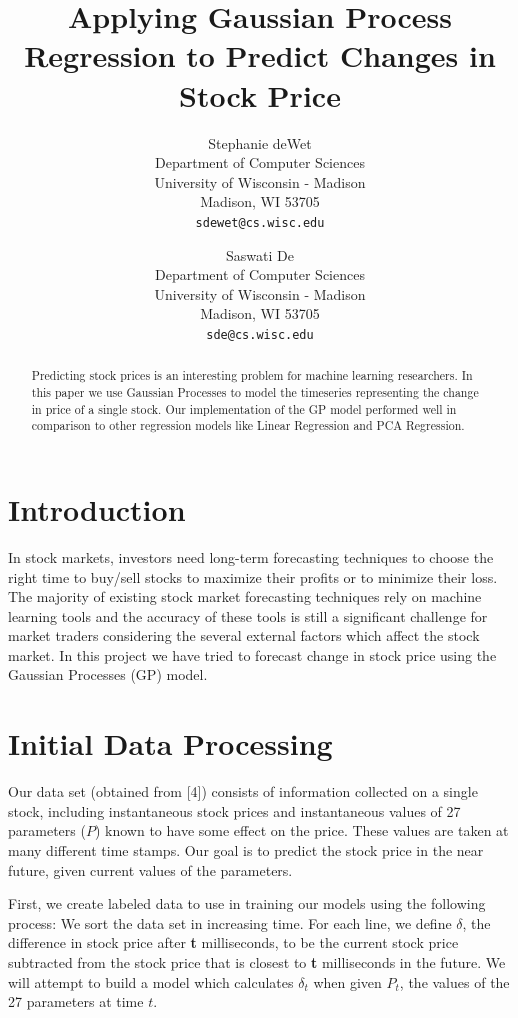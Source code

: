 \documentclass{article} %
\author{
Stephanie deWet \\
Department of Computer Sciences\\
University of Wisconsin - Madison \\
Madison, WI 53705 \\
\texttt{sdewet@cs.wisc.edu} \\
\and
Saswati De \\
Department of Computer Sciences\\
University of Wisconsin - Madison \\
Madison, WI 53705 \\
\texttt{sde@cs.wisc.edu} \\
}
\title{Applying Gaussian Process Regression to Predict Changes in Stock Price}
\begin{document}
\maketitle

\begin{abstract}
Predicting stock prices is an interesting problem for machine learning researchers. In this paper we use Gaussian Processes to model the timeseries representing the change in price of a single stock. Our implementation of the GP model performed well in comparison to other regression models like Linear Regression and PCA Regression.
\end{abstract}

\section{Introduction}
In stock markets, investors need long-term forecasting techniques to choose the right time to buy/sell stocks to maximize their profits or to minimize their loss. The majority of existing stock market forecasting techniques rely on machine learning tools and the accuracy of these tools is still a significant challenge for market traders considering the several external factors which affect the stock market. In this project we have tried to forecast change in stock price using the Gaussian Processes (GP) model.

\section{Initial Data Processing}
Our data set (obtained from [4]) consists of information collected on a single stock, including instantaneous stock prices and instantaneous values of 27 parameters ($P$) known to have some effect on the price.
These values are taken at many different time stamps.
Our goal is to predict the stock price in the near future, given current values of the parameters.

First, we create labeled data to use in training our models using the following process:
We sort the data set in increasing time.
For each line, we define $\delta$, the difference in stock price after \textbf{t} milliseconds, to be the current stock price subtracted from the stock price that is closest to \textbf{t} milliseconds in the future.
We will attempt to build a model which calculates $\delta_t$ when given $P_t$, the values of the 27 parameters at time $t$.
\end{document}

